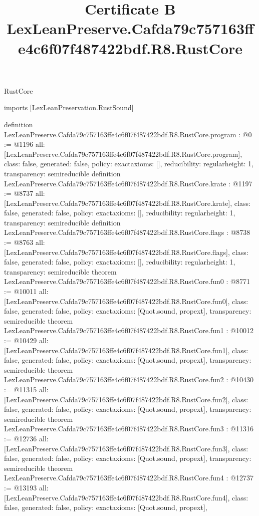 \begin{lexlean}{RustCore}
\title{Certificate B LexLeanPreserve.Cafda79c757163ffe4c6f07f487422bdf.R8.RustCore}
\begin{coremodule}
imports [LexLeanPreservation.RustSound]

definition LexLeanPreserve.Cafda79c757163ffe4c6f07f487422bdf.R8.RustCore.program : @0 := @1196 {
  all: [LexLeanPreserve.Cafda79c757163ffe4c6f07f487422bdf.R8.RustCore.program],
  class: false,
  generated: false,
  policy: exact{axioms: []},
  reducibility: regular{height: 1},
  transparency: semireducible
}
definition LexLeanPreserve.Cafda79c757163ffe4c6f07f487422bdf.R8.RustCore.krate : @1197 := @8737 {
  all: [LexLeanPreserve.Cafda79c757163ffe4c6f07f487422bdf.R8.RustCore.krate],
  class: false,
  generated: false,
  policy: exact{axioms: []},
  reducibility: regular{height: 1},
  transparency: semireducible
}
definition LexLeanPreserve.Cafda79c757163ffe4c6f07f487422bdf.R8.RustCore.flags : @8738 := @8763 {
  all: [LexLeanPreserve.Cafda79c757163ffe4c6f07f487422bdf.R8.RustCore.flags],
  class: false,
  generated: false,
  policy: exact{axioms: []},
  reducibility: regular{height: 1},
  transparency: semireducible
}
theorem LexLeanPreserve.Cafda79c757163ffe4c6f07f487422bdf.R8.RustCore.fun0 : @8771 := @10011 {
  all: [LexLeanPreserve.Cafda79c757163ffe4c6f07f487422bdf.R8.RustCore.fun0],
  class: false,
  generated: false,
  policy: exact{axioms: [Quot.sound, propext]},
  transparency: semireducible
}
theorem LexLeanPreserve.Cafda79c757163ffe4c6f07f487422bdf.R8.RustCore.fun1 : @10012 := @10429 {
  all: [LexLeanPreserve.Cafda79c757163ffe4c6f07f487422bdf.R8.RustCore.fun1],
  class: false,
  generated: false,
  policy: exact{axioms: [Quot.sound, propext]},
  transparency: semireducible
}
theorem LexLeanPreserve.Cafda79c757163ffe4c6f07f487422bdf.R8.RustCore.fun2 : @10430 := @11315 {
  all: [LexLeanPreserve.Cafda79c757163ffe4c6f07f487422bdf.R8.RustCore.fun2],
  class: false,
  generated: false,
  policy: exact{axioms: [Quot.sound, propext]},
  transparency: semireducible
}
theorem LexLeanPreserve.Cafda79c757163ffe4c6f07f487422bdf.R8.RustCore.fun3 : @11316 := @12736 {
  all: [LexLeanPreserve.Cafda79c757163ffe4c6f07f487422bdf.R8.RustCore.fun3],
  class: false,
  generated: false,
  policy: exact{axioms: [Quot.sound, propext]},
  transparency: semireducible
}
theorem LexLeanPreserve.Cafda79c757163ffe4c6f07f487422bdf.R8.RustCore.fun4 : @12737 := @13193 {
  all: [LexLeanPreserve.Cafda79c757163ffe4c6f07f487422bdf.R8.RustCore.fun4],
  class: false,
  generated: false,
  policy: exact{axioms: [Quot.sound, propext]},
}
\end{coremodule}
\end{lexlean}
